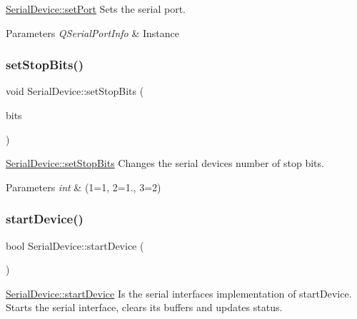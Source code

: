 \hyperlink{class_serial_device_a1440b389cc1bba66e9854a32a5807a8f}{Serial\+Device\+::set\+Port} Sets the serial port. 


\begin{DoxyParams}{Parameters}
{\em Q\+Serial\+Port\+Info} & Instance \\
\hline
\end{DoxyParams}
\hypertarget{class_serial_device_a95b44d8167ae0a6a025ba9c4f2d5ee47}{}\label{class_serial_device_a95b44d8167ae0a6a025ba9c4f2d5ee47} 
\subsubsection{\texorpdfstring{set\+Stop\+Bits()}{setStopBits()}}
{\footnotesize\ttfamily void Serial\+Device\+::set\+Stop\+Bits (\begin{DoxyParamCaption}\item[{int}]{bits }\end{DoxyParamCaption})}



\hyperlink{class_serial_device_a95b44d8167ae0a6a025ba9c4f2d5ee47}{Serial\+Device\+::set\+Stop\+Bits} Changes the serial device\textquotesingle{}s number of stop bits. 


\begin{DoxyParams}{Parameters}
{\em int} & (1=1, 2=1., 3=2) \\
\hline
\end{DoxyParams}
\hypertarget{class_serial_device_a6940a33b7c8f4b83438d16cfa7d8d3ff}{}\label{class_serial_device_a6940a33b7c8f4b83438d16cfa7d8d3ff} 
\subsubsection{\texorpdfstring{start\+Device()}{startDevice()}}
{\footnotesize\ttfamily bool Serial\+Device\+::start\+Device (\begin{DoxyParamCaption}{ }\end{DoxyParamCaption})\hspace{0.3cm}{\ttfamily [virtual]}}



\hyperlink{class_serial_device_a6940a33b7c8f4b83438d16cfa7d8d3ff}{Serial\+Device\+::start\+Device} Is the serial interface\textquotesingle{}s implementation of start\+Device. Starts the serial interface, clears its buffers and updates status. 

